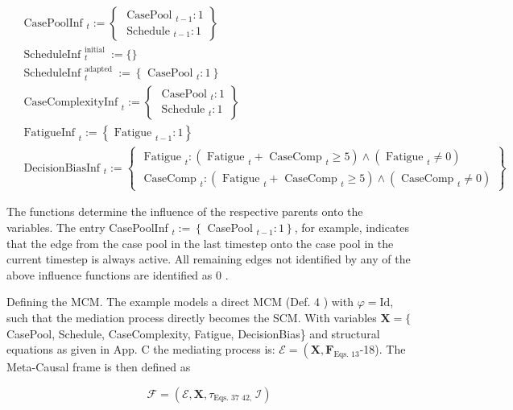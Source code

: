\documentclass[10pt]{article}
\begin{document}
\begin{align*}
& \text { CasePoolInf }_{t}:=\left\{\begin{array}{l}
\text { CasePool }_{t-1}: 1 \\
\text { Schedule }_{t-1}: 1
\end{array}\right\}  \tag{37}\\
& \text { ScheduleInf }_{t}^{\text {initial }}:=\{ \}  \tag{38}\\
& \text { ScheduleInf }_{t}^{\text {adapted }}:=\left\{\text { CasePool }_{t}: 1\right\}  \tag{39}\\
& \text { CaseComplexityInf }_{t}:=\left\{\begin{array}{l}
\text { CasePool }_{t}: 1 \\
\text { Schedule }_{t}: 1
\end{array}\right\}  \tag{40}\\
& \text { FatigueInf }_{t}:=\left\{\text { Fatigue }_{t-1}: 1\right\}  \tag{41}\\
& \text { DecisionBiasInf }_{t}:=\left\{\begin{array}{c}
\text { Fatigue }_{t}:\left(\text { Fatigue }_{t}+\text { CaseComp }_{t} \geq 5\right) \wedge\left(\text { Fatigue }_{t} \neq 0\right) \\
\text { CaseComp }_{t}:\left(\text { Fatigue }_{t}+\text { CaseComp }_{t} \geq 5\right) \wedge\left(\text { CaseComp }_{t} \neq 0\right)
\end{array}\right\} \tag{42}
\end{align*}


The functions determine the influence of the respective parents onto the variables. The entry CasePoolInf ${ }_{t}:=\left\{\right.$ CasePool $\left._{t-1}: 1\right\}$, for example, indicates that the edge from the case pool in the last timestep onto the case pool in the current timestep is always active. All remaining edges not identified by any of the above influence functions are identified as 0 .

Defining the MCM. The example models a direct MCM (Def. 4 ) with $\varphi=\mathrm{Id}$, such that the mediation process directly becomes the SCM. With variables $\mathbf{X}=\{$ CasePool, Schedule, CaseComplexity, Fatigue, DecisionBias\} and structural equations as given in App. C the mediating process is: $\mathcal{E}= \left(\mathbf{X}, \mathbf{F}_{\text {Eqs. } 13}\right.$-18). The Meta-Causal frame is then defined as


\begin{equation*}
\mathcal{F}=\left(\mathcal{E}, \mathbf{X}, \tau_{\text {Eqs. } 37 \text { 42, }} \mathcal{I}\right) \tag{43}
\end{equation*}
\end{document}

